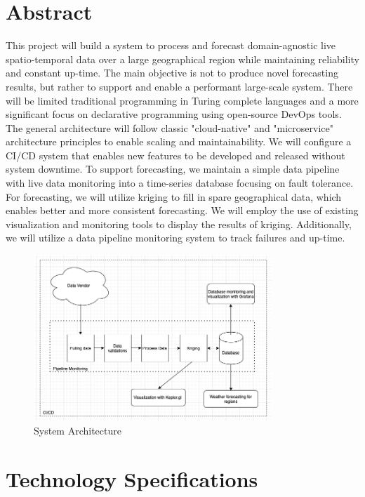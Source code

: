 \section{Abstract}
\noindent This project will build a system to process and forecast domain-agnostic live spatio-temporal data over a large geographical region while maintaining reliability and constant up-time. The main objective is not to produce novel forecasting results, but rather to support and enable a performant large-scale system. There will be limited traditional programming in Turing complete languages and a more significant focus on declarative programming using open-source DevOps tools. The general architecture will follow classic "cloud-native" and "microservice" architecture principles to enable scaling and maintainability. We will configure a CI/CD system that enables new features to be developed and released without system downtime. To support forecasting, we maintain a simple data pipeline with live data monitoring into a time-series database focusing on fault tolerance. For forecasting, we will utilize kriging to fill in spare geographical data, which enables better and more consistent forecasting. We will employ the use of existing visualization and monitoring tools to display the results of kriging. Additionally, we will utilize a data pipeline monitoring system to track failures and up-time. 



\begin{figure}[ht]
\centering
\includegraphics[angle=0,width=0.8\textwidth]{documentation/project_proposal/architecture.png}
\caption{System Architecture}
\end{figure}

\newpage %

\section{Technology Specifications}
\noindent 

